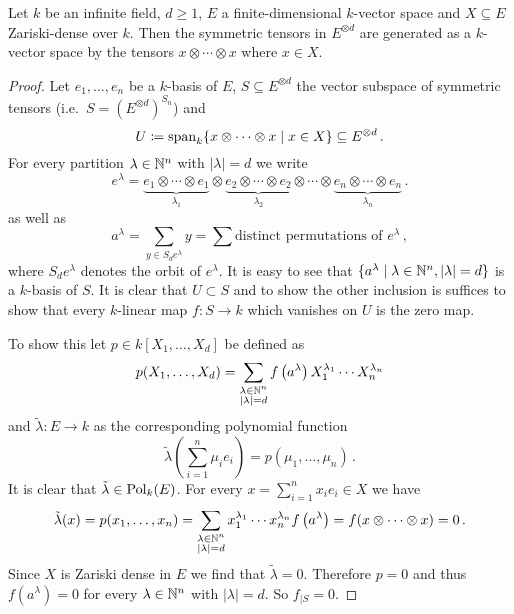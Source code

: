 \begin{lemma}\label{lemma: symmetric tensors and zariski dense subsets}
  Let $k$ be an infinite field, $d \geq 1$, $E$ a finite-dimensional $k$-vector space and $X \subseteq E$ Zariski-dense over $k$.
  Then the symmetric tensors in $E^{\otimes d}$ are generated as a $k$-vector space by the tensors $x \otimes \dotsb \otimes x$ where $x \in X$.
\end{lemma}
\begin{proof}
  Let $e_1, \dotsc, e_n$ be a $k$-basis of $E$, $S \subseteq E^{\otimes d}$ the vector subspace of symmetric tensors (i.e.\ $S = (E^{\otimes d})^{S_n}$) and
  \[
              U
    \coloneqq \operatorname{span}_k \{ x \otimes \dotsb \otimes x \mid x \in X \}
    \subseteq E^{\otimes d} \,.
  \]
  For every partition $\lambda \in \mathbb{N}^n$ with $|\lambda| = d$ we write
  \[
      e^\lambda
    =         \underbrace{e_1 \otimes \dotsb \otimes e_1}_{\lambda_1}
      \otimes \underbrace{e_2 \otimes \dotsb \otimes e_2}_{\lambda_2}
      \otimes \dotsb
      \otimes \underbrace{e_n \otimes \dotsb \otimes e_n}_{\lambda_n} \,.
  \]
  as well as
  \[
      a^\lambda
    = \sum_{y \in S_d e^\lambda} y
    = \sum \text{distinct permutations of $e^\lambda$} \,,
  \]
  where $S_d e^\lambda$ denotes the orbit of $e^\lambda$.
  It is easy to see that $\{ a^\lambda \mid \lambda \in \mathbb{N}^n, |\lambda| = d \}$ is a $k$-basis of $S$.
  It is clear that $U \subset S$ and to show the other inclusion is suffices to show that every $k$-linear map $f \colon S \to k$ which vanishes on $U$ is the zero map.
  
  To show this let $p \in k[X_1, \dotsc, X_d]$ be defined as
  \[
      p(X_1, \dotsc, X_d)
    = \sum_{\substack{\lambda \in \mathbb{N}^n \\ |\lambda| = d}}
        f\left( a^\lambda \right)
        X_1^{\lambda_1} \dotsm X_n^{\lambda_n}
  \]
  and $\tilde{\lambda} \colon E \to k$ as the corresponding polynomial function
  \[
      \tilde{\lambda}\left( \sum_{i=1}^n \mu_i e_i \right)
    = p(\mu_1, \dotsc, \mu_n) \,.
  \]
  It is clear that $\tilde{\lambda} \in \operatorname{Pol}_k(E)$.
  For every $x = \sum_{i=1}^n x_i e_i \in X$ we have
  \[
      \tilde{\lambda}(x)
    = p(x_1, \dotsc, x_n)
    = \sum_{\substack{\lambda \in \mathbb{N}^n \\ |\lambda| = d}}
        x_1^{\lambda_1} \dotsm x_n^{\lambda_n}
        f\left( a^\lambda \right) 
    = f(x \otimes \dotsb \otimes x)
    = 0 \,.
  \]
  Since $X$ is Zariski dense in $E$ we find that $\tilde{\lambda} = 0$.
  Therefore $p = 0$ and thus $f(a^\lambda) = 0$ for every $\lambda \in \mathbb{N}^n$ with $|\lambda| = d$.
  So $f_{|S} = 0$.
\end{proof}


